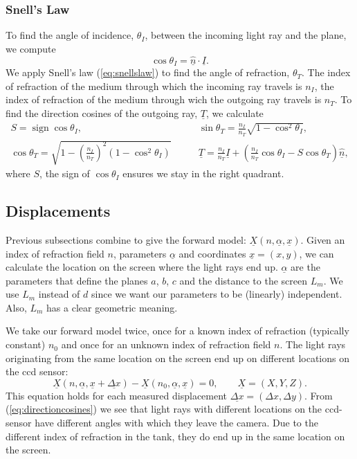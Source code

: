 \documentclass[draft]{svjour3}                     %
\DeclareMathOperator{\sign}{sign}
\begin{document}
\subsubsection{Snell's Law}
To find the angle of incidence, $\theta_I$, between the incoming light ray and the plane, we compute
\begin{equation}
	\cos \theta_I = \underline{\hat{n}} \cdot \underline{I}.
\end{equation}
We apply Snell's law (\ref{eq:snellslaw}) to find the angle of refraction, $\theta_T$. The index of refraction of the medium through which the incoming ray travels is $n_I$, the index of refraction of the medium through wich the outgoing ray travels is $n_T$. To find the direction cosines of the outgoing ray, $\underline{T}$, we calculate 
\begin{align}
	S = \sign \cos \theta_I, &\qquad
	\sin \theta_T = \frac{n_I}{n_T} \sqrt{1-\cos^2 \theta_I}, \\
	\cos \theta_T = \sqrt{1-\left(\frac{n_I}{n_T}\right)^2(1-\cos^2 \theta_I)} &\qquad
	\underline{T} = \frac{n_I}{n_T} \underline{I} + \left(\frac{n_I}{n_T} \cos \theta_I - S \cos\theta_T\right)\underline{\hat{n}},	
\end{align}
where $S$, the sign of $\cos\theta_I$ ensures we stay in the right quadrant.

\subsection{Displacements}
\label{subsec:dis}
Previous subsections combine to give the forward model: $\underline{X}(n,\underline{\alpha}, \underline{x})$. Given an index of refraction field $n$, parameters $\underline{\alpha}$ and coordinates $\underline{x} = (x,y)$, we can calculate the location on the screen where the light rays end up. $\underline{\alpha}$ are the parameters that define the planes $a$, $b$, $c$ and the distance to the screen $L_m$. We use $L_m$ instead of $d$ since we want our parameters to be (linearly) independent. Also, $L_m$ has a clear geometric meaning.

We take our forward model twice, once for a known index of refraction (typically constant) $n_0$ and once for an unknown index of refraction field $n$. The light rays originating from the same location on the screen end up on different locations on the ccd sensor:
\begin{equation}
\label{eq:ForwardModel}
	 \underline{X}(n, \underline{\alpha}, \underline{x}+\underline{\Delta x}) - \underline{X}(n_0, \underline{\alpha}, \underline{x}) = 0, \qquad \underline{X} = (X, Y, Z).
\end{equation}
This equation holds for each measured displacement $\underline{\Delta x} = (\Delta x, \Delta y)$. From (\ref{eq:directioncosines}) we see that light rays with different locations on the ccd-sensor have different angles with which they leave the camera. Due to the different index of refraction in the tank, they do end up in the same location on the screen.
\end{document}
